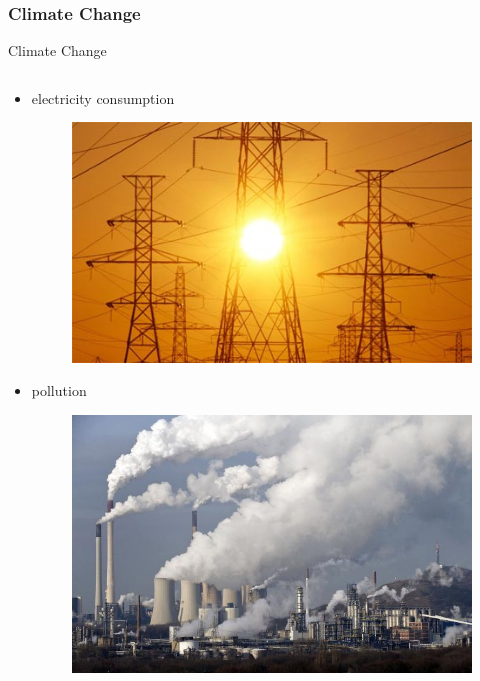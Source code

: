 \documentclass{beamer}
\begin{document}
\subsubsection{Climate Change}
\begin{frame}{Climate Change}

\begin{columns}
  \begin{column}{0.5\textwidth}
    \begin{itemize}
        \item electricity consumption
	        	\begin{figure}
		\centering
		\includegraphics[scale=0.25]{images/electricity_consumption.jpg}
		\end{figure}
	\item pollution
		\begin{figure}
		\centering
		\includegraphics[scale=0.2]{images/pollution.jpg}
		\end{figure}
    \end{itemize}
  \end{column}


\end{columns}
\end{frame}
\end{document}
